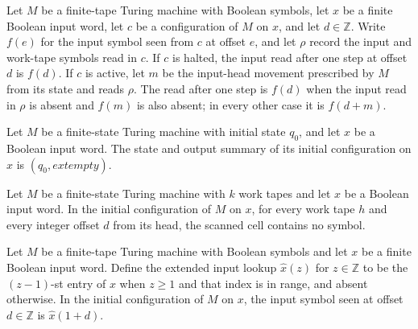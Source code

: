 \begin{theorem}
\label{Complexity.Meyer.RI_step}
\leanok
{}
Let $M$ be a finite-tape Turing machine with Boolean symbols, let $x$ be a finite
Boolean input word, let $c$ be a configuration of $M$ on $x$, and let $d\in\mathbb{Z}$.
Write $f(e)$ for the input symbol seen from $c$ at offset $e$, and let $\rho$ record the
input and work-tape symbols read in $c$. If $c$ is halted, the input read after one step
at offset $d$ is $f(d)$. If $c$ is active, let $m$ be the input-head movement prescribed
by $M$ from its state and reads $\rho$. The read after one step is $f(d)$ when the input
read in $\rho$ is absent and $f(m)$ is also absent; in every other case it is $f(d+m)$.
\end{theorem}

\begin{theorem}
\label{Complexity.Meyer.SS_init}
\leanok
{}
Let $M$ be a finite-state Turing machine with initial state $q_0$, and let $x$ be a
Boolean input word. The state and output summary of its initial configuration on $x$ is
$(q_0,	ext{empty})$.
\end{theorem}

\begin{theorem}
\label{Complexity.Meyer.RW_init}
\leanok
{}
Let $M$ be a finite-state Turing machine with $k$ work tapes and let $x$ be a Boolean
input word. In the initial configuration of $M$ on $x$, for every work tape $h$ and
every integer offset $d$ from its head, the scanned cell contains no symbol.
\end{theorem}

\begin{theorem}
\label{Complexity.Meyer.RI_init}
\leanok
{}
Let $M$ be a finite-tape Turing machine with Boolean symbols and let $x$ be a finite
Boolean input word. Define the extended input lookup $\widehat{x}(z)$ for
$z\in\mathbb{Z}$ to be the $(z-1)$-st entry of $x$ when $z\geq1$ and that index is in
range, and absent otherwise. In the initial configuration of $M$ on $x$, the input
symbol seen at offset $d\in\mathbb{Z}$ is $\widehat{x}(1+d)$.
\end{theorem}

